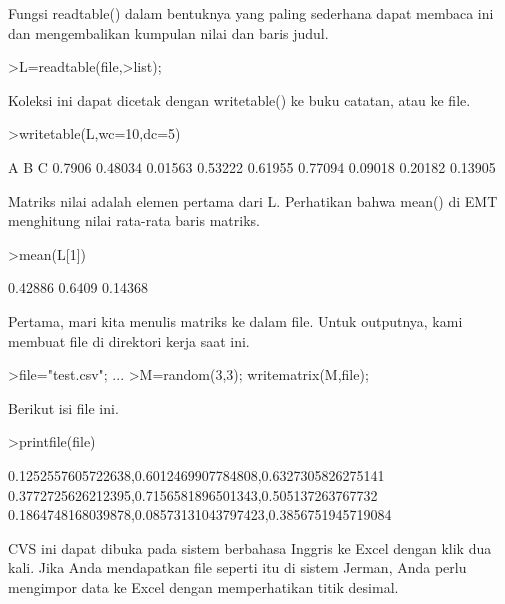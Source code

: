 \documentclass[a4paper,10pt]{article}
\begin{document}
\begin{eulernotebook}
\begin{eulercomment}
\begin{eulercomment}
\begin{eulercomment}
\begin{eulercomment}
\begin{eulercomment}
\begin{eulercomment}
\begin{eulercomment}
\begin{eulercomment}
\begin{euleroutput}
\end{euleroutput}
\begin{eulercomment}
Fungsi readtable() dalam bentuknya yang paling sederhana dapat membaca
ini dan mengembalikan kumpulan nilai dan baris judul.
\end{eulercomment}
\begin{eulerprompt}
>L=readtable(file,>list);
\end{eulerprompt}
\begin{eulercomment}
Koleksi ini dapat dicetak dengan writetable() ke buku catatan, atau ke
file.
\end{eulercomment}
\begin{eulerprompt}
>writetable(L,wc=10,dc=5)
\end{eulerprompt}
\begin{euleroutput}
           A         B         C
      0.7906   0.48034   0.01563
     0.53222   0.61955   0.77094
     0.09018   0.20182   0.13905
\end{euleroutput}
\begin{eulercomment}
Matriks nilai adalah elemen pertama dari L. Perhatikan bahwa mean() di
EMT menghitung nilai rata-rata baris matriks.
\end{eulercomment}
\begin{eulerprompt}
>mean(L[1])
\end{eulerprompt}
\begin{euleroutput}
    0.42886 
     0.6409 
    0.14368 
\end{euleroutput}
\begin{eulercomment}
Pertama, mari kita menulis matriks ke dalam file. Untuk outputnya,
kami membuat file di direktori kerja saat ini.
\end{eulercomment}
\begin{eulerprompt}
>file="test.csv";  ...
>M=random(3,3); writematrix(M,file);
\end{eulerprompt}
\begin{eulercomment}
Berikut isi file ini.
\end{eulercomment}
\begin{eulerprompt}
>printfile(file)
\end{eulerprompt}
\begin{euleroutput}
  0.1252557605722638,0.6012469907784808,0.6327305826275141
  0.3772725626212395,0.7156581896501343,0.505137263767732
  0.1864748168039878,0.08573131043797423,0.3856751945719084
  
\end{euleroutput}
\begin{eulercomment}
CVS ini dapat dibuka pada sistem berbahasa Inggris ke Excel dengan
klik dua kali. Jika Anda mendapatkan file seperti itu di sistem
Jerman, Anda perlu mengimpor data ke Excel dengan memperhatikan titik
desimal.


\end{eulercomment}
\end{eulercomment}
\end{eulercomment}
\end{eulercomment}
\end{eulercomment}
\end{eulercomment}
\end{eulercomment}
\end{eulercomment}
\end{eulercomment}
\end{eulernotebook}
\end{document}
